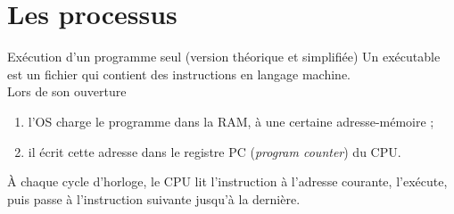 \documentclass[10pt]{beamer}
\begin{document}
\section{Les processus}
\begin{frame}{Exécution d'un programme seul (version théorique et simplifiée)}\pause
Un \alert{exécutable} est un fichier qui contient des instructions en langage machine.\\\pause
Lors de son ouverture\pause
\begin{enumerate}[--]
	\item l'OS charge le programme dans la RAM, à une certaine adresse-mémoire ;\pause
    \item il écrit cette adresse dans le registre PC (\textit{program counter}) du CPU.\pause
\end{enumerate}
À chaque cycle d'horloge, le CPU lit l'instruction à l'adresse courante, l'exécute, puis passe à l'instruction suivante jusqu'à la dernière.
\end{frame}
\end{document}
